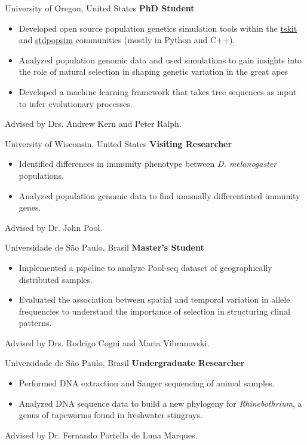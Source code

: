 	{%
		University of Oregon, United States
    }
	{%
		\textbf{PhD Student}
    }
	{%
        \begin{itemize}
            \item Developed open source population genetics simulation tools within the \href{https://tskit.dev/software/}{tskit} and \href{https://popsim-consortium.github.io/stdpopsim-docs/stable/index.html}{stdpopsim} communities (mostly in Python and C++). 
            \item Analyzed population genomic data and used simulations to gain insights into the role of natural selection in shaping genetic variation in the great apes
            \item Developed a machine learning framework that takes tree sequences as input to infer evolutionary processes.
        \end{itemize}
        {\footnotesize Advised by Drs. Andrew Kern and Peter Ralph.}
    }

	{%
		University of Wisconsin, United States
    }
	{%
		\textbf{Visiting Researcher}
    }
	{%
        \begin{itemize}
            \item Identified differences in immunity phenotype between \textit{D. melanogaster} populations.
            \item Analyzed population genomic data to find unusually differentiated immunity genes.
        \end{itemize}
        {\footnotesize Advised by Dr. John Pool.}
    }

	{%
		Universidade de São Paulo, Brasil
    }
	{%
		\textbf{Master's Student}
    }
	{%
        \begin{itemize}
            \item Implemented a pipeline to analyze Pool-seq dataset of geographically distributed samples.
            \item Evaluated the association between spatial and temporal variation in allele frequencies to understand the importance of selection in structuring clinal patterns.
        \end{itemize}
        {\footnotesize Advised by Drs. Rodrigo Cogni and Maria Vibranovski.}
    }

	{%
		Universidade de São Paulo, Brasil
    }
	{%
		\textbf{Undergraduate Researcher}
    }
	{%
        \begin{itemize}
            \item Performed DNA extraction and Sanger sequencing of animal samples.
            \item Analyzed DNA sequence data to build a new phylogeny for \textit{Rhinebothrium}, a genus of tapeworms found in freshwater stingrays.
        \end{itemize}
        {\footnotesize Advised by Dr. Fernando Portella de Luna Marques.}
    }

